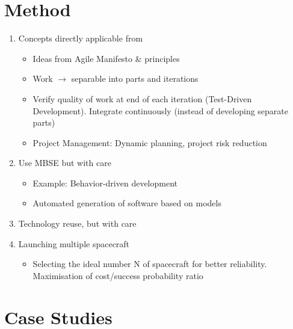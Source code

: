 \documentclass[]{iac}
\begin{document}
\section{Method}
\begin{enumerate}
\def\labelenumi{\arabic{enumi}.}
\item
  Concepts directly applicable from \cite{douglass_agile_2015}

  \begin{itemize}
  \item
    Ideas from Agile Manifesto \& principles
  \item
    Work $\to$ separable into parts and iterations
  \item
    Verify quality of work at end of each iteration (Test-Driven
    Development). Integrate continuously (instead of developing separate
    parts)
  \item
    Project Management: Dynamic planning, project risk reduction
  \end{itemize}
\item
  Use MBSE but with care

  \begin{itemize}
  \item
    Example: Behavior-driven development
  \item Automated generation of software based on models \autocite{perrotin_taste_2012,bychkov_using_2018}
  \end{itemize}
\item
  Technology reuse, but with care
\item
  Launching multiple spacecraft \autocite{hein_attosats_2019, adams_r-selected_2019}

  \begin{itemize}
  \item
    Selecting the ideal number N of spacecraft for better reliability. Maximisation of cost/success probability ratio

  \end{itemize}
\end{enumerate}
\section{Case Studies}
\end{document}
